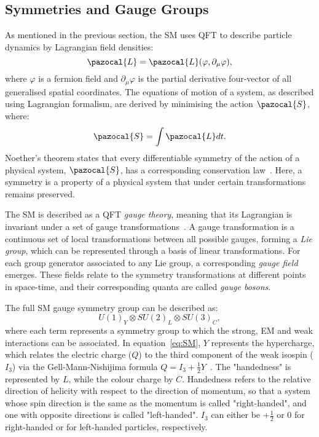 	 \subsection*{Symmetries and Gauge Groups}
	As mentioned in the previous section, the \ac{SM} uses \ac{QFT} to describe particle dynamics by Lagrangian field densities:%
	\begin{equation}
	\pazocal{L}=\pazocal{L}(\varphi,\partial_{\mu}\varphi),
	\end{equation}
	where $\varphi$ is a fermion field and $\partial_{\mu}\varphi$ is the partial derivative four-vector of all generalised spatial coordinates. The equations of motion of a system, as described using Lagrangian formalism, are derived by minimising the action $\pazocal{S}$, where:
	\begin{equation}
\pazocal{S} = \int \pazocal{L}dt.
	\end{equation}
	Noether's theorem states that every differentiable symmetry of the action of a physical system, $\pazocal{S}$, has a corresponding conservation law~\cite{doi:10.1080/00411457108231446}. 
	Here, a symmetry is a property of a physical system that under certain transformations remains preserved.

	The \ac{SM} is described as a \ac{QFT} \textit{gauge theory}, meaning that its Lagrangian is invariant under a set of gauge transformations~\cite{lederman2004symmetry}. 
	A gauge transformation is a continuous set of local transformations between all possible gauges, forming a \textit{Lie group}, which can be represented through a basis of linear transformations. 
	For each group generator associated to any Lie group, a corresponding \textit{gauge field} emerges.
	These fields relate to the symmetry transformations at different points in space-time, and their corresponding quanta are called \textit{gauge bosons}.

	The full \ac{SM} gauge symmetry group can be described as:
		\begin{equation}
		U(1)_{Y} \otimes SU(2)_L \otimes SU(3)_C,
		\label{eq:SM}
		\end{equation}
	where each term represents a symmetry group to which the strong, \ac{EM} and weak interactions can be associated.
	In equation~\ref{eq:SM}, $Y$ represents the hypercharge, which relates the electric charge ($Q$) to the third component of the weak isospin ($I_3$) via the Gell-Mann-Nishijima formula $Q=I_3+\frac{1}{2}Y$~\cite{GMformula,Nformula}. The "handedness" is represented by $L$, while the colour charge by $C$. 
	Handedness refers to the relative direction of helicity with respect to the direction of momentum, so that a system whose spin direction is the same as the momentum is called "right-handed", and one with opposite directions is called "left-handed".
	$I_3$ can either be $+\frac{1}{2}$ or 0 for right-handed or for left-handed particles, respectively.
